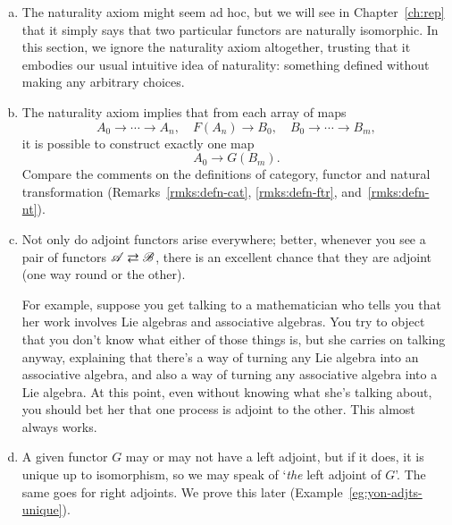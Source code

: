 \begin{remarks} 
\label{rmks:adjts}
\begin{enumerate}[(b)]
\item           
\label{rmk:adjts:nat}
The naturality axiom might seem ad hoc, but we will see in
Chapter~\ref{ch:rep} that it simply says that two particular functors are
naturally isomorphic.  In this section, we ignore the naturality axiom
altogether, trusting that it embodies our usual intuitive idea of
naturality: something defined without making any arbitrary choices.

\item 
The naturality axiom implies that from each array of maps
\[
A_0 \to \cdots \to A_n,
\quad
F(A_n) \to B_0,
\quad
B_0 \to \cdots \to B_m,
\]
it is possible to construct exactly one%
%
%
map
\[
A_0 \to G(B_m).
\]
Compare the comments on the definitions of category, functor and natural
transformation (Remarks~\ref{rmks:defn-cat},
\ref{rmks:defn-ftr},
and~\ref{rmks:defn-nt}).

\item   
\label{rmk:Lie-ass}
Not only do adjoint functors arise everywhere; better, whenever you see a
pair of functors $\mathscr{A}\rightleftarrows \mathscr{B}$, there is an excellent chance
that they are adjoint (one way round or the other).

For example, suppose you get talking to a mathematician who tells you that
her work involves Lie%
%
%
%
%
algebras and associative algebras.  You try to object
that you don't know what either of those things is, but she carries on
talking anyway, explaining that there's a way of turning any Lie algebra
into an associative algebra, and also a way of turning any associative
algebra into a Lie algebra.  At this point, even without knowing what she's
talking about, you should bet her that one process is adjoint to the other.
This almost always works.

\item   
\label{rmks:adjts:uniqueness}
A given functor $G$ may or may not have a left adjoint, but if it does, it is
unique%
%
%
up to isomorphism, so we may speak of `\emph{the} left adjoint of $G$'.
The same goes for right adjoints.  We prove this later
(Example~\ref{eg:yon-adjts-unique}).


\end{enumerate}
\end{remarks}
